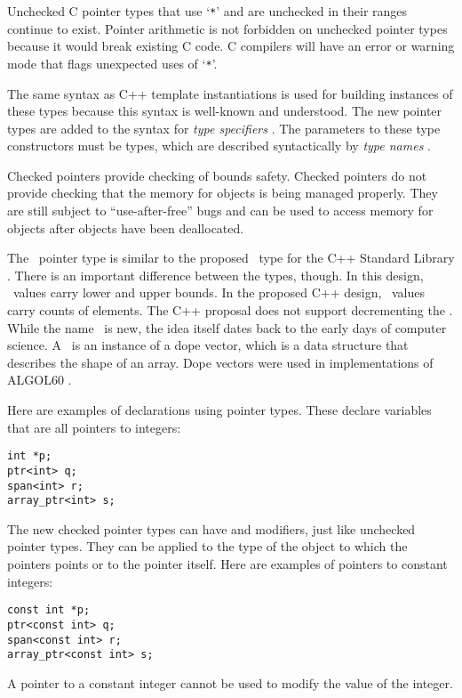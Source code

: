 Unchecked C pointer types that use `\texttt{*}' and are unchecked in their
ranges continue to exist. Pointer arithmetic is not forbidden on unchecked
pointer types because it would break existing C code. C compilers will
have an error or warning mode that flags unexpected uses of `\texttt{*}'.

The same syntax as C++ template instantiations is used for building
instances of these types because this syntax is well-known and
understood.  The new pointer types are added to the syntax for {\it type specifiers} 
\cite[Section 6.7.2]{ISO2011}. The parameters to these type constructors 
must be types, which are described syntactically by {\it type names} \cite[Section 6.7.7]{ISO2011}.

Checked pointers provide checking of bounds safety.  Checked
pointers do not provide checking that the memory for objects is being managed
properly.  They are still subject to ``use-after-free'' bugs and can be used
to access memory for objects after objects have been deallocated.

The \spanptr\ pointer type is similar to the proposed \spanptr\ type for 
the C++ Standard Library \cite{Macintosh2016}.   There is an important
difference between the types, though.  In this design, \spanptr\
values carry lower and upper bounds.  In the proposed C++ design,
\spanptr\ values carry counts of elements.  The C++ proposal does not
support decrementing the \spanptr.  While the name \spanptr\ is new,
the idea itself dates back to the early days of computer science.
A \spanptr\ is an instance of a  dope vector, which is a data structure 
that describes the shape of an array.  Dope vectors were used in
implementations of ALGOL60 \cite{Sattley1961}.

Here are  examples of declarations using pointer types.   These declare variables that
are all pointers to integers:
\begin{verbatim}
int *p;
ptr<int> q;
span<int> r;
array_ptr<int> s;
\end{verbatim}

The new checked pointer types can have  and 
modifiers, just like unchecked pointer types.   They can be applied to the type
of the object to which the pointers points or to the pointer itself.  Here are examples
of pointers to constant integers:
\begin{verbatim}
const int *p;
ptr<const int> q;
span<const int> r;
array_ptr<const int> s;
\end{verbatim}
A pointer to a constant integer cannot be used to modify the value of
the integer.

